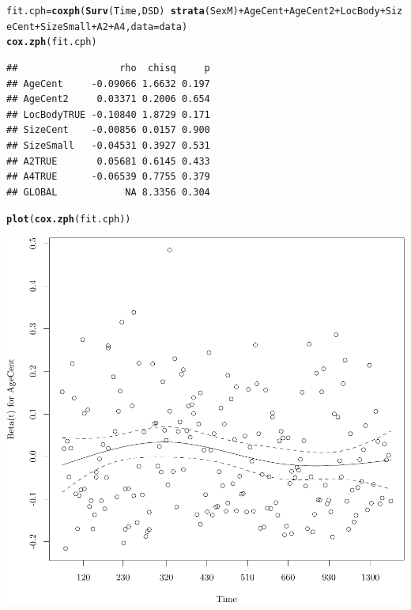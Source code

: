 \documentclass{article}\usepackage[]{graphicx}\usepackage[]{color}
\makeatletter
\def\maxwidth{ %
  \ifdim\Gin@nat@width>\linewidth
    \linewidth
  \else
    \Gin@nat@width
  \fi
}
\newcommand{\hlopt}[1]{\textcolor[rgb]{0,0,0}{#1}}%
\newcommand{\hlstd}[1]{\textcolor[rgb]{0.345,0.345,0.345}{#1}}%
\newcommand{\hlkwb}[1]{\textcolor[rgb]{0.69,0.353,0.396}{#1}}%
\newcommand{\hlkwc}[1]{\textcolor[rgb]{0.333,0.667,0.333}{#1}}%
\newcommand{\hlkwd}[1]{\textcolor[rgb]{0.737,0.353,0.396}{\textbf{#1}}}%
\newenvironment{kframe}{%
 \def\at@end@of@kframe{}%
 \ifinner\ifhmode%
  \def\at@end@of@kframe{\end{minipage}}%
  \begin{minipage}{\columnwidth}%
 \fi\fi%
 \def\FrameCommand##1{\hskip\@totalleftmargin \hskip-\fboxsep
 \colorbox{shadecolor}{##1}\hskip-\fboxsep
     \hskip-\linewidth \hskip-\@totalleftmargin \hskip\columnwidth}%
 \MakeFramed {\advance\hsize-\width
   \@totalleftmargin\z@ \linewidth\hsize
   \@setminipage}}%
 {\par\unskip\endMakeFramed%
 \at@end@of@kframe}
\newenvironment{knitrout}{}{} %
\makeatother
\begin{document}
\begin{knitrout}
\color{fgcolor}\begin{kframe}
\begin{alltt}
\hlstd{fit.cph} \hlkwb{=} \hlkwd{coxph}\hlstd{(}\hlkwd{Surv}\hlstd{(Time, DSD)} \hlopt{~} \hlkwd{strata}\hlstd{(SexM)} \hlopt{+} \hlstd{AgeCent} \hlopt{+} \hlstd{AgeCent2} \hlopt{+} \hlstd{LocBody} \hlopt{+} \hlstd{SizeCent} \hlopt{+} \hlstd{SizeSmall} \hlopt{+} \hlstd{A2} \hlopt{+} \hlstd{A4,} \hlkwc{data} \hlstd{= data)}
\hlkwd{cox.zph}\hlstd{(fit.cph)}
\end{alltt}
\begin{verbatim}
##                  rho  chisq     p
## AgeCent     -0.09066 1.6632 0.197
## AgeCent2     0.03371 0.2006 0.654
## LocBodyTRUE -0.10840 1.8729 0.171
## SizeCent    -0.00856 0.0157 0.900
## SizeSmall   -0.04531 0.3927 0.531
## A2TRUE       0.05681 0.6145 0.433
## A4TRUE      -0.06539 0.7755 0.379
## GLOBAL            NA 8.3356 0.304
\end{verbatim}
\begin{alltt}
\hlkwd{plot}\hlstd{(}\hlkwd{cox.zph}\hlstd{(fit.cph))}
\end{alltt}
\end{kframe}

{\centering \includegraphics[width=\maxwidth]{figure/05-eda-ph-check-full-3-1} 

}





\end{knitrout}
\end{document}
